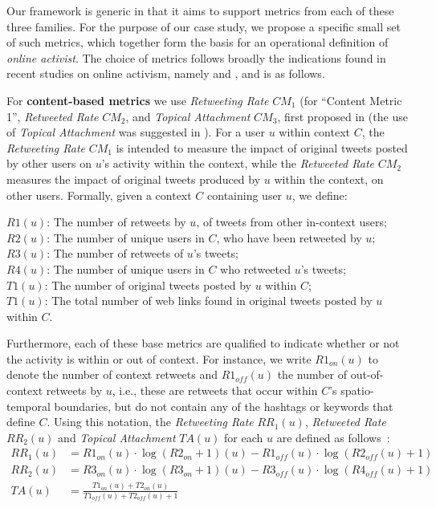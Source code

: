 \documentclass[runningheads]{llncs}
\begin{document}
Our framework is generic in that it aims to support metrics from each of these three families.
For the purpose of our case study, we propose a specific small set of such metrics, which together form   the basis for an operational definition of \textit{online activist}.
The choice of metrics follows broadly the indications found in recent studies on online activism, namely \cite{Lotan2011} and  \cite{Poell2014}, and is as follows.

For \textbf{content-based metrics} we use  \textit{Retweeting Rate} $CM_1$ (for ``Content Metric 1'', \textit{Retweeted Rate} $CM_2$, and  \textit{Topical Attachment}  $CM_3$, first proposed in \cite{Bizid:2015} (the use of \textit{Topical Attachment} was suggested in \cite{Poell2014}).
%
For a user $u$ within context $C$, the \textit{Retweeting Rate}  $CM_1$ is intended to measure the impact of  original tweets posted  by other users on $u$'s activity within the context, while the \textit{Retweeted Rate} $CM_2$  measures the impact of original tweets produced by $u$ within the context, on other users.
Formally, given a context $C$ containing user $u$, we define:

\noindent 
$R1(u)$: The number of retweets by $u$, of tweets from other in-context users;\\
$R2(u)$: The number of unique users in $C$, who have been retweeted by $u$; \\
$R3(u)$: The number of retweets of $u$'s  tweets; \\
$R4(u)$: The number of unique users in $C$ who retweeted $u$'s tweets; \\
$T1(u)$: The number of original tweets posted by $u$ within $C$; \\
$T1(u)$: The total number of web links found in original tweets posted by $u$ within $C$.

Furthermore, each of these base metrics  are qualified to indicate whether or not the activity is within or out of context.
For instance, we write $R1_{on}(u)$ to denote the number of context retweets and $R1_{off}(u)$ the number of out-of-context retweets by $u$, i.e., these are retweets that occur within $C$'s spatio-temporal boundaries, but do not contain any of the hashtags or keywords that define $C$.  
Using this notation, the \textit{Retweeting Rate} $RR_1(u)$, \textit{Retweeted Rate} $RR_2(u)$ and \textit{Topical Attachment} $TA(u)$ for each $u$ are defined as follows~\cite{Bizid:2015}:
\begin{align}
RR_1(u) & =  R1_{on}(u) \cdot \log(R2_{on}+1)(u) - R1_{off}(u) \cdot \log(R2_{off}(u)+1) \\
RR_2(u) & =  R3_{on}(u) \cdot \log(R3_{on}+1)(u) - R3_{off}(u) \cdot \log(R4_{off}(u)+1) \\
TA(u) & = \frac{T1_{on}(u) + T2_{on}(u)}{T1_{off}(u) + T2_{off}(u) +1} 
\end{align}
\end{document}
